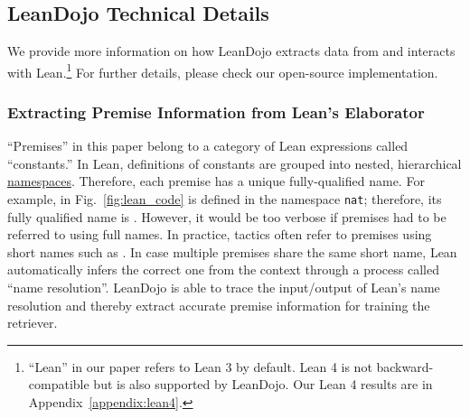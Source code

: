 \setcounter{table}{0}
\renewcommand{\thetable}{\Alph{table}}
\setcounter{figure}{0}
\renewcommand{\thefigure}{\Alph{figure}}
\setcounter{section}{0}
\renewcommand{\thesection}{\Alph{section}}


\subsection{LeanDojo Technical Details}
\label{appendix:leandojo}

We provide more information on how LeanDojo extracts data from and interacts with Lean.\footnote{``Lean'' in our paper refers to Lean 3 by default. Lean 4 is not backward-compatible but is also supported by LeanDojo. Our Lean 4 results are in Appendix~\ref{appendix:lean4}.} For further details, please check our open-source implementation. 

\subsubsection{Extracting Premise Information from Lean's Elaborator}
\label{appendix:leandojo:premises}

``Premises'' in this paper belong to a category of Lean expressions called ``constants.'' In Lean, definitions of constants are grouped into nested, hierarchical \href{https://leanprover.github.io/theorem_proving_in_lean/dependent_type_theory.html#namespaces}{namespaces}. Therefore, each premise has a unique fully-qualified name. For example,  in Fig.~\ref{fig:lean_code} is defined in the namespace \texttt{nat}; therefore, its fully qualified name is \texttt{}. However, it would be too verbose if premises had to be referred to using full names. In practice, tactics often refer to premises using short names such as . In case multiple premises share the same short name, Lean automatically infers the correct one from the context through a process called ``name resolution''. LeanDojo is able to trace the input/output of Lean's name resolution and thereby extract accurate premise information for training the retriever.

